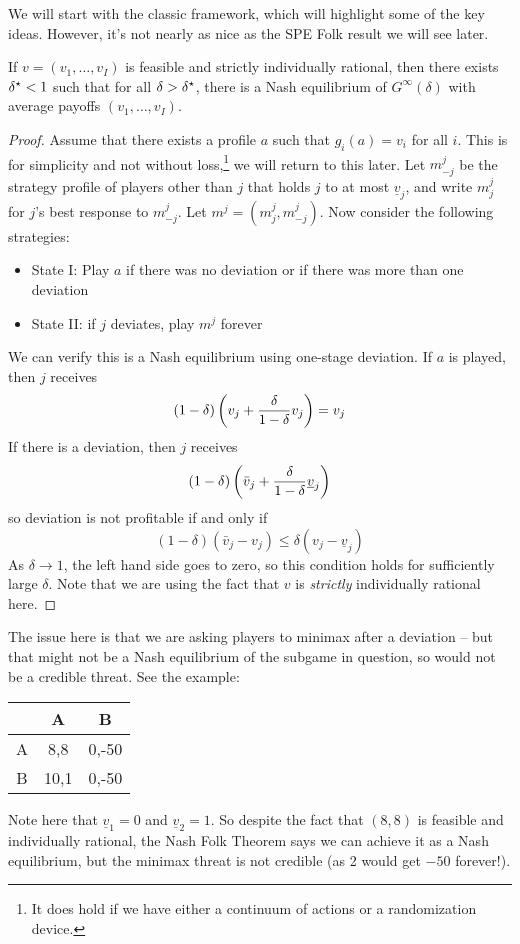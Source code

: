 \documentclass[10pt]{article}
\begin{document}
We will start with the classic framework, which will highlight some of the key ideas. However, it's not nearly as nice as the SPE Folk result we will see later.

\begin{theorem}
	 If $ v=(v_1,\dots,v_I)$ is feasible and strictly individually rational, then there exists $\delta^\star < 1$ such that for all $\delta > \delta^\star$, there is a Nash equilibrium of $G^\infty (\delta)$ with average payoffs $(v_1,\dots,v_I)$. 
\end{theorem}
\begin{proof}
	Assume that there exists a profile $a$ such that $g_i(a) = v_i$ for all $i$. This is for simplicity and not without loss,\footnote{It does hold if we have either a continuum of actions or a randomization device.} we will return to this later. Let $m_{-j}^j$ be the strategy profile of players other than $j$ that holds $j$ to at most $\underline{v}_j$, and write $m_j^j$ for $j$'s best response to $m_{-j}^j$. Let $m^j = (m^j_j,m^j_{-j})$. Now consider the following strategies: \begin{itemize} \item State I: Play $a$ if there was no deviation or if there was more than one deviation \item  State II: if $j$ deviates, play $m^j$ forever \end{itemize}We can verify this is a Nash equilibrium using one-stage deviation. If $a$ is played, then $j$ receives \[(1-\delta) \left( v_j + \frac{\delta}{1-\delta} v_j\right) = v_j\]If there is a deviation, then $j$ receives \[(1-\delta) \left( \bar{v}_j + \frac{\delta}{1-\delta} \underline{v}_j\right)\]so deviation is not profitable if and only if \[(1-\delta)(\bar{v}_j - v_j) \le \delta (v_j - \underline{v}_j)\]As $\delta \to 1$, the left hand side goes to zero, so this condition holds for sufficiently large $\delta$. Note that we are using the fact that $v$ is \emph{strictly} individually rational here.
\end{proof}

\begin{remark}
	The issue here is that we are asking players to minimax after a deviation -- but that might not be a Nash equilibrium of the subgame in question, so would not be a credible threat. See the example:
	\begin{center}
		\begin{tabular}{c|cc}
			& A & B \\\hline A & 8,8 & 0,-50 \\ B & 10,1 & 0,-50
		\end{tabular}
	\end{center}
	Note here that $\underline{v}_1 = 0$ and $\underline{v}_2 = 1$. So despite the fact that $(8,8)$ is feasible and individually rational, the Nash Folk Theorem says we can achieve it as a Nash equilibrium, but the minimax threat is not credible (as 2 would get $-50$ forever!).
\end{remark}
\end{document}
